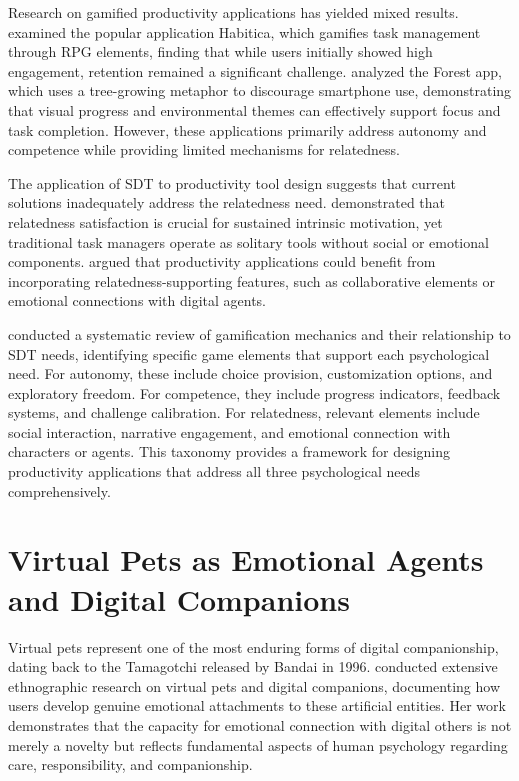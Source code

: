 Research on gamified productivity applications has yielded mixed results. \citet{thom2012removing} examined the popular application Habitica, which gamifies task management through RPG elements, finding that while users initially showed high engagement, retention remained a significant challenge. \citet{koivisto2019rise} analyzed the Forest app, which uses a tree-growing metaphor to discourage smartphone use, demonstrating that visual progress and environmental themes can effectively support focus and task completion. However, these applications primarily address autonomy and competence while providing limited mechanisms for relatedness.

The application of SDT to productivity tool design suggests that current solutions inadequately address the relatedness need. \citet{sheldon2001satisfying} demonstrated that relatedness satisfaction is crucial for sustained intrinsic motivation, yet traditional task managers operate as solitary tools without social or emotional components. \citet{rigby2011glued} argued that productivity applications could benefit from incorporating relatedness-supporting features, such as collaborative elements or emotional connections with digital agents.

\citet{sailer2017psychological} conducted a systematic review of gamification mechanics and their relationship to SDT needs, identifying specific game elements that support each psychological need. For autonomy, these include choice provision, customization options, and exploratory freedom. For competence, they include progress indicators, feedback systems, and challenge calibration. For relatedness, relevant elements include social interaction, narrative engagement, and emotional connection with characters or agents. This taxonomy provides a framework for designing productivity applications that address all three psychological needs comprehensively.

\section{Virtual Pets as Emotional Agents and Digital Companions}
\label{sec:virtual-pets}

\inprogress

Virtual pets represent one of the most enduring forms of digital companionship, dating back to the Tamagotchi released by Bandai in 1996. \citet{turkle2007evocative} conducted extensive ethnographic research on virtual pets and digital companions, documenting how users develop genuine emotional attachments to these artificial entities. Her work demonstrates that the capacity for emotional connection with digital others is not merely a novelty but reflects fundamental aspects of human psychology regarding care, responsibility, and companionship.

